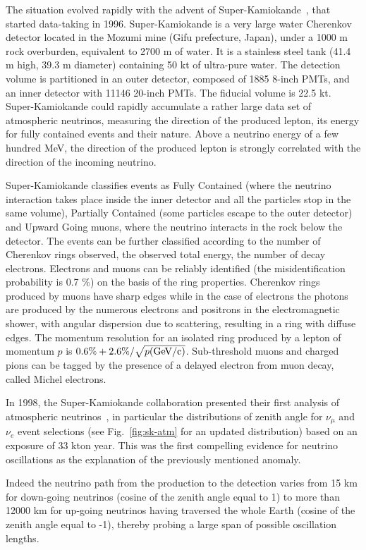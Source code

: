 The situation evolved rapidly with the advent of Super-Kamiokande~\cite{sknim}, that started data-taking in 1996. Super-Kamiokande is a very large water Cherenkov detector located in the Mozumi mine (Gifu prefecture, Japan), under a 1000 m rock overburden, equivalent to 2700 m of water. It is a stainless steel tank (41.4 m high, 39.3 m diameter) containing 50 kt of ultra-pure water. The detection volume is partitioned in an outer detector, composed of 1885 8-inch PMTs, and an inner detector with 11146 20-inch PMTs. The fiducial volume is 22.5 kt. Super-Kamiokande could rapidly accumulate a rather large data set of atmospheric neutrinos, measuring the direction of the produced lepton, its energy for fully contained events and their nature. Above a neutrino energy of a few hundred MeV, the direction of the produced lepton is strongly correlated with the direction of the incoming neutrino.

Super-Kamiokande classifies events as Fully Contained (where the neutrino interaction takes place inside the inner detector and all the particles stop in the same volume), Partially Contained (some particles escape to the outer detector) and Upward Going muons, where the neutrino interacts in the rock below the detector. The events can be further classified according to the number of Cherenkov rings observed, the observed total energy, the number of decay electrons. Electrons and muons can be reliably identified (the misidentification probability is 0.7 \%) on the basis of the ring properties. Cherenkov rings produced by muons have sharp edges while in the case of electrons the photons are produced by the numerous electrons and positrons in the electromagnetic shower, with angular dispersion due to scattering, resulting in a ring with diffuse edges. The momentum resolution for an isolated ring produced by a lepton of momentum $p$ is $0.6\% +2.6\%/\sqrt{p ({\rm GeV/c})}$. Sub-threshold muons and charged pions can be tagged by the presence of a delayed electron from muon decay, called Michel electrons.

In 1998, the Super-Kamiokande collaboration presented their first analysis of atmospheric neutrinos~\cite{Fukuda:1998mi}, in particular the distributions of zenith angle for $ \nu_\mu$ and $\nu_e$ event selections (see Fig.~\ref{fig:sk-atm} for an updated distribution) based on an exposure of 33 kton year. This was the first compelling evidence for neutrino oscillations as the explanation of the previously mentioned anomaly.  

Indeed the neutrino path from the production to the detection varies from 15 km for down-going neutrinos (cosine of the zenith angle equal to 1) to more than 12000 km for up-going neutrinos having traversed the whole Earth (cosine of the zenith angle equal to -1), thereby probing a large span of possible oscillation lengths. 

